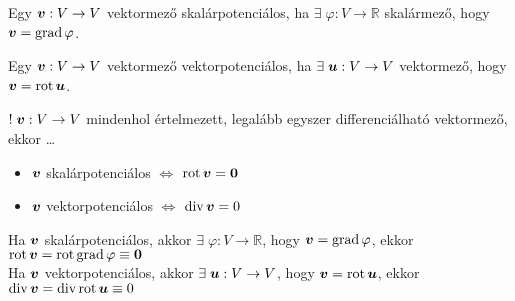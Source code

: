 \documentclass[main.tex]{subfiles}
\begin{document}

Egy $\boldsymbol{v}: V \rightarrow V$ vektormező skalárpotenciálos,
ha $\exists \; \varphi : V \rightarrow \mathbb{R}$ skalármező,
hogy $\boldsymbol{v} = \operatorname{grad} \varphi$.




Egy $\boldsymbol{v}: V \rightarrow V$ vektormező vektorpotenciálos,
ha $\exists \; \boldsymbol{u} : V \rightarrow V$ vektormező,
hogy $\boldsymbol{v} = \operatorname{rot} \boldsymbol{u}$.




$! \; \boldsymbol{v}: V \rightarrow V$ mindenhol értelmezett,
legalább egyszer differenciálható vektormező, ekkor \dots
\begin{itemize}
  \item $\boldsymbol{v}$ skalárpotenciálos $\Leftrightarrow$
        $\operatorname{rot} \boldsymbol{v} = \boldsymbol{0}$

  \item $\boldsymbol{v}$ vektorpotenciálos $\Leftrightarrow$
        $\operatorname{div} \boldsymbol{v} = 0$
\end{itemize}




Ha $\boldsymbol{v}$ skalárpotenciálos, akkor
$\exists \; \varphi : V \rightarrow \mathbb{R}$,
hogy $\boldsymbol{v} = \operatorname{grad} \varphi$, ekkor
$\operatorname{rot} \boldsymbol{v} = \operatorname{rot} \operatorname{grad} \varphi \equiv \boldsymbol{0}$
\\[.33em]
Ha $\boldsymbol{v}$ vektorpotenciálos, akkor
$\exists \; \boldsymbol{u} : V \rightarrow V$,
hogy $\boldsymbol{v} = \operatorname{rot} \boldsymbol{u}$, ekkor
$\operatorname{div} \boldsymbol{v} = \operatorname{div} \operatorname{rot} \boldsymbol{u} \equiv 0$



\end{document}
